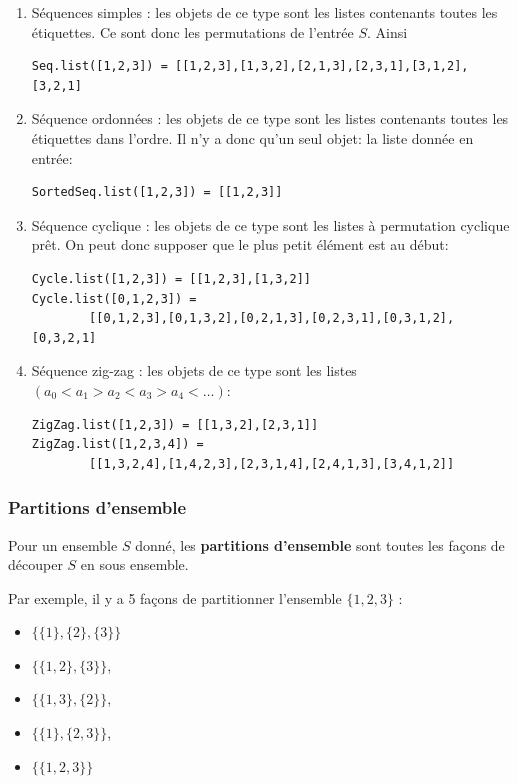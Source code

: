 \documentclass[11pt]{article}
\renewcommand{\emph}[1]{\textbf{#1}}
\begin{document}
\begin{enumerate}
\item Séquences simples : les objets de ce type sont les listes contenants
  toutes les étiquettes. Ce sont donc les permutations de l'entrée $S$. Ainsi
\begin{verbatim}
Seq.list([1,2,3]) = [[1,2,3],[1,3,2],[2,1,3],[2,3,1],[3,1,2],[3,2,1]
\end{verbatim}
\item Séquence ordonnées : les objets de ce type sont les listes contenants
  toutes les étiquettes dans l'ordre. Il n'y a donc qu'un seul objet: la liste
  donnée en entrée:
\begin{verbatim}
SortedSeq.list([1,2,3]) = [[1,2,3]]
\end{verbatim}
\item Séquence cyclique : les objets de ce type sont les listes à permutation
  cyclique prêt. On peut donc supposer que le plus petit élément est au début:
\begin{verbatim}
Cycle.list([1,2,3]) = [[1,2,3],[1,3,2]]
Cycle.list([0,1,2,3]) =
        [[0,1,2,3],[0,1,3,2],[0,2,1,3],[0,2,3,1],[0,3,1,2],[0,3,2,1]
\end{verbatim}
\item Séquence zig-zag : les objets de ce type sont les listes
  $(a_0<a_1>a_2<a_3>a_4<\dots)$:
\begin{verbatim}
ZigZag.list([1,2,3]) = [[1,3,2],[2,3,1]]
ZigZag.list([1,2,3,4]) =
        [[1,3,2,4],[1,4,2,3],[2,3,1,4],[2,4,1,3],[3,4,1,2]]
\end{verbatim}
\end{enumerate}

\subsubsection{Partitions d'ensemble}
\label{seq:set-partitions}

Pour un ensemble $S$ donné, les \emph{partitions d'ensemble} sont toutes
les façons de découper $S$ en sous ensemble.

Par exemple, il y a 5 façons de partitionner l'ensemble $\lbrace 1,2,3 \rbrace$ :

\begin{itemize}
\item $\lbrace\lbrace 1 \rbrace, \lbrace 2 \rbrace, \lbrace 3 \rbrace\rbrace$
\item $\lbrace\lbrace 1,2 \rbrace, \lbrace 3 \rbrace\rbrace$,
\item $\lbrace\lbrace 1,3 \rbrace, \lbrace 2 \rbrace\rbrace$,
\item $\lbrace\lbrace 1 \rbrace, \lbrace 2,3 \rbrace\rbrace$,
\item $\lbrace\lbrace 1,2,3 \rbrace\rbrace$
\end{itemize}
\end{document}
